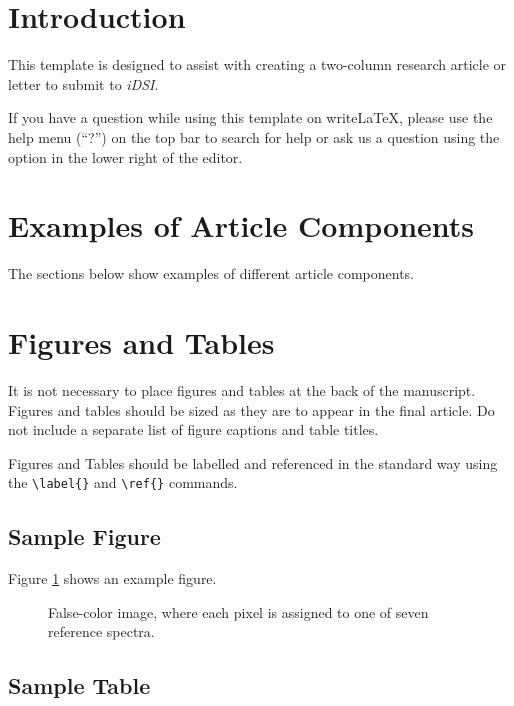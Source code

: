 \documentclass[9pt,twocolumn,twoside]{idsi}
\begin{document}
\makecoverpage

\maketitle

\section{Introduction}
This template is designed to assist with creating a two-column research article or letter to submit to \emph{iDSI}.

If you have a question while using this template on write\LaTeX{}, please use the help menu (``?'') on the top bar to search for help or ask us a question using the option in the lower right of the editor.

\section{Examples of Article Components}
\label{sec:examples}

The sections below show examples of different article components.

\section{Figures and Tables}

It is not necessary to place figures and tables at the back of the manuscript. Figures and tables should be sized as they are to appear in the final article. Do not include a separate list of figure captions and table titles.

Figures and Tables should be labelled and referenced in the standard way using the \verb|\label{}| and \verb|\ref{}| commands.

\subsection{Sample Figure}

Figure \ref{fig:false-color} shows an example figure.

\begin{figure}[htbp]
\centering
\caption{False-color image, where each pixel is assigned to one of seven reference spectra.}
\label{fig:false-color}
\end{figure}

\subsection{Sample Table}
\end{document}
